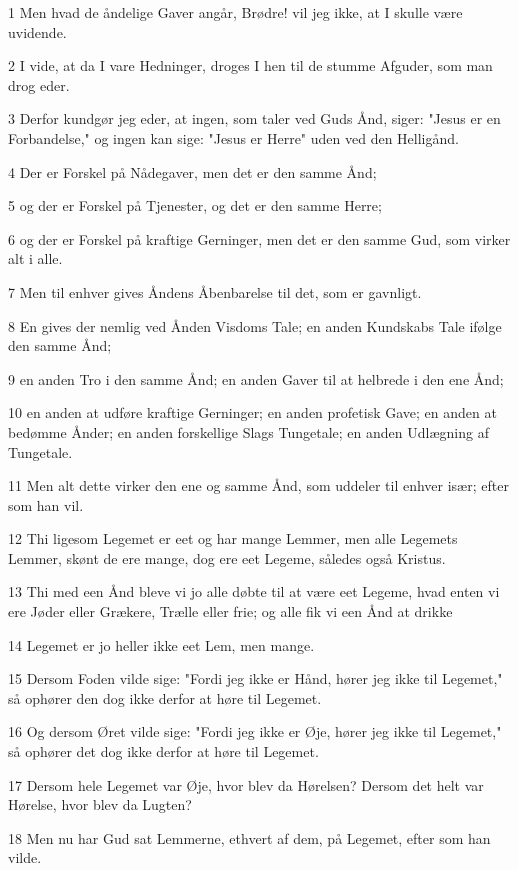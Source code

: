 \par 1 Men hvad de åndelige Gaver angår, Brødre! vil jeg ikke, at I skulle være uvidende.
\par 2 I vide, at da I vare Hedninger, droges I hen til de stumme Afguder, som man drog eder.
\par 3 Derfor kundgør jeg eder, at ingen, som taler ved Guds Ånd, siger: "Jesus er en Forbandelse," og ingen kan sige: "Jesus er Herre" uden ved den Helligånd.
\par 4 Der er Forskel på Nådegaver, men det er den samme Ånd;
\par 5 og der er Forskel på Tjenester, og det er den samme Herre;
\par 6 og der er Forskel på kraftige Gerninger, men det er den samme Gud, som virker alt i alle.
\par 7 Men til enhver gives Åndens Åbenbarelse til det, som er gavnligt.
\par 8 En gives der nemlig ved Ånden Visdoms Tale; en anden Kundskabs Tale ifølge den samme Ånd;
\par 9 en anden Tro i den samme Ånd; en anden Gaver til at helbrede i den ene Ånd;
\par 10 en anden at udføre kraftige Gerninger; en anden profetisk Gave; en anden at bedømme Ånder; en anden forskellige Slags Tungetale; en anden Udlægning af Tungetale.
\par 11 Men alt dette virker den ene og samme Ånd, som uddeler til enhver især; efter som han vil.
\par 12 Thi ligesom Legemet er eet og har mange Lemmer, men alle Legemets Lemmer, skønt de ere mange, dog ere eet Legeme, således også Kristus.
\par 13 Thi med een Ånd bleve vi jo alle døbte til at være eet Legeme, hvad enten vi ere Jøder eller Grækere, Trælle eller frie; og alle fik vi een Ånd at drikke
\par 14 Legemet er jo heller ikke eet Lem, men mange.
\par 15 Dersom Foden vilde sige: "Fordi jeg ikke er Hånd, hører jeg ikke til Legemet," så ophører den dog ikke derfor at høre til Legemet.
\par 16 Og dersom Øret vilde sige: "Fordi jeg ikke er Øje, hører jeg ikke til Legemet," så ophører det dog ikke derfor at høre til Legemet.
\par 17 Dersom hele Legemet var Øje, hvor blev da Hørelsen? Dersom det helt var Hørelse, hvor blev da Lugten?
\par 18 Men nu har Gud sat Lemmerne, ethvert af dem, på Legemet, efter som han vilde.
